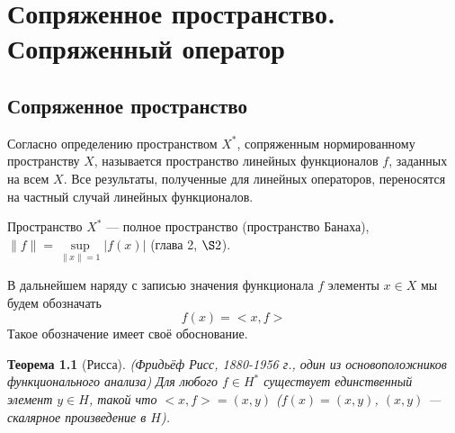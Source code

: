 \documentclass[12pt,a4paper,titlepage,oneside]{book}
\theoremstyle{definition}
\theoremstyle{plain}
\newtheorem*{theorem}{Теорема}
\theoremstyle{remark}
\theoremstyle{remark}
\theoremstyle{remark}
\theoremstyle{remark}
\theoremstyle{plain}
\theoremstyle{plain}
\begin{document}
\chapter{Сопряженное пространство. Сопряженный оператор}

\section{Сопряженное пространство}

Согласно определению пространством $X^*$, сопряженным нормированному пространству $X$, называется пространство линейных функционалов $f$, заданных на всем $X$. Все результаты, полученные для линейных операторов, переносятся на частный случай линейных функционалов.

Пространство $X^*$ --- полное пространство (пространство Банаха), $\lVert f\rVert = \sup\limits_{\lVert x\rVert = 1}\lvert f(x)\rvert$ (глава 2, $\S 2$).

В дальнейшем наряду с записью значения функционала $f$ элементы $x \in X$ мы будем обозначать
\begin{equation*}
f(x) = <x, f>
\end{equation*}
Такое обозначение имеет своё обоснование.
\begin{theorem}[Рисса]
(Фридьёф Рисс, 1880-1956 г., один из основоположников функционального анализа)  Для любого $f \in H^*$ существует единственный элемент $y \in H$, такой что $<x, f>=(x,y)$ ($f(x)=(x,y)$, $(x,y)$ --- скалярное произведение в $H$).
\end{theorem}
\end{document}

